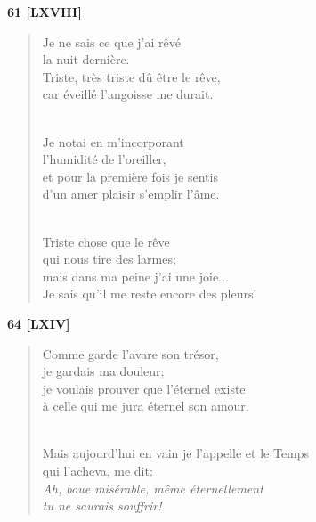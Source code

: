 \documentclass[a4paper,12pt]{book}
\begin{document}
\bigskip

\begin{center} {\bf 61 [LXVIII]} \end{center}

\begin{verse}
Je ne sais ce que j'ai rêvé \\
la nuit dernière. \\
Triste, très triste dû être le rêve, \\
car éveillé l'angoisse me durait. \\ \


Je notai en m'incorporant \\
l'humidité de l'oreiller, \\
et pour la première fois je sentis \\
d'un amer plaisir s'emplir l'âme. \\ \

Triste chose que le rêve \\
qui nous tire des larmes; \\
mais dans ma peine j'ai une joie... \\
Je sais qu'il me reste encore des pleurs! \\
\end{verse}

\bigskip

\begin{center} {\bf 64 [LXIV]} \end{center}

\begin{verse}
Comme garde l'avare son trésor, \\
je gardais ma douleur; \\
je voulais prouver que l'éternel existe \\
à celle qui me jura éternel son amour. \\ \

Mais aujourd'hui en vain je l'appelle et le Temps \\
qui l'acheva, me dit: \\
{\em Ah, boue misérable, même éternellement \\
tu ne saurais souffrir!} \\
\end{verse}
\end{document}
